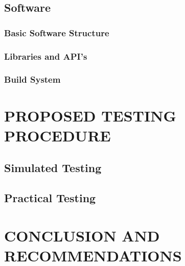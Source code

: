 \documentclass[10pt,twocolumn]{witseiepaper}
\begin{document}
	\subsection{Software}
		\subsubsection{Basic Software Structure}
		\subsubsection{Libraries and API's}
		\subsubsection{Build System}

\section{PROPOSED TESTING PROCEDURE}
	\subsection{Simulated Testing}
	\subsection{Practical Testing}

\section{CONCLUSION AND RECOMMENDATIONS}



 
\end{document}
